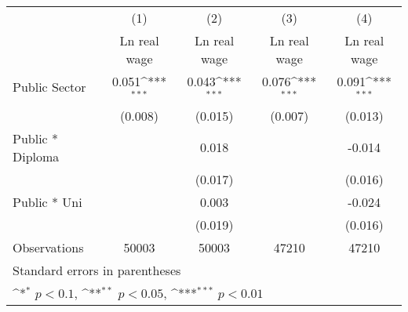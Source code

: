 {
\def\sym#1{\ifmmode^{#1}\else\(^{#1}\)\fi}
\begin{tabular}{l*{4}{c}}
\hline\hline
                    &\multicolumn{1}{c}{(1)}&\multicolumn{1}{c}{(2)}&\multicolumn{1}{c}{(3)}&\multicolumn{1}{c}{(4)}\\
                    &\multicolumn{1}{c}{Ln real wage}&\multicolumn{1}{c}{Ln real wage}&\multicolumn{1}{c}{Ln real wage}&\multicolumn{1}{c}{Ln real wage}\\
\hline
Public Sector       &       0.051\sym{***}&       0.043\sym{***}&       0.076\sym{***}&       0.091\sym{***}\\
                    &     (0.008)         &     (0.015)         &     (0.007)         &     (0.013)         \\
Public * Diploma    &                     &       0.018         &                     &      -0.014         \\
                    &                     &     (0.017)         &                     &     (0.016)         \\
Public * Uni        &                     &       0.003         &                     &      -0.024         \\
                    &                     &     (0.019)         &                     &     (0.016)         \\
\hline
Observations        &       50003         &       50003         &       47210         &       47210         \\
\hline\hline
\multicolumn{5}{l}{\footnotesize Standard errors in parentheses}\\
\multicolumn{5}{l}{\footnotesize \sym{*} \(p<0.1\), \sym{**} \(p<0.05\), \sym{***} \(p<0.01\)}\\
\end{tabular}
}

